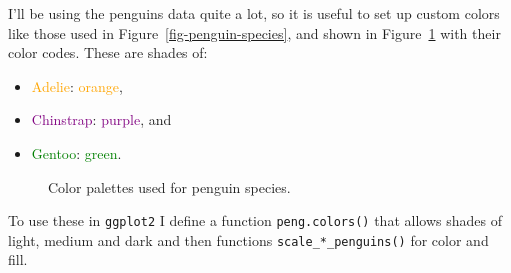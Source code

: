 \documentclass[
  letterpaper,
  10pt,
  krantz2]{krantz}
\providecommand{\tightlist}{%
  \setlength{\itemsep}{0pt}\setlength{\parskip}{0pt}}\usepackage{longtable,booktabs,array}
\begin{document}
I'll be using the penguins data quite a lot, so it is useful to set up
custom colors like those used in Figure~\ref{fig-penguin-species}, and
shown in Figure~\ref{fig-peng-colors} with their color codes. These are
shades of:

\begin{itemize}
\tightlist
\item
  \textcolor{orange}{Adelie}: \textcolor{orange}{orange},
\item
  \textcolor{purple}{Chinstrap}: \textcolor{purple}{purple}, and
\item
  \textcolor{green}{Gentoo}: \textcolor{green}{green}.
\end{itemize}

\begin{figure}


\caption{\label{fig-peng-colors}Color palettes used for penguin
species.}

\end{figure}%

To use these in \texttt{ggplot2} I define a function
\texttt{peng.colors()} that allows shades of light, medium and dark and
then functions \texttt{scale\_*\_penguins()} for color and fill.
\end{document}
